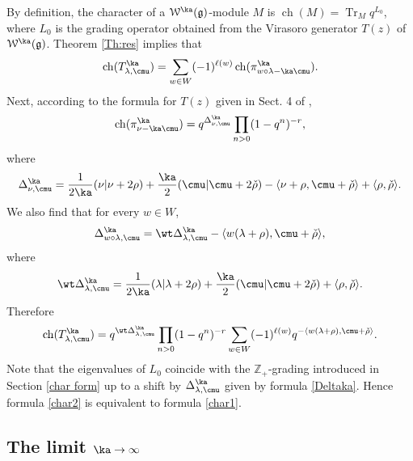 \documentclass{amsart}
\newcommand{\bra}{{\langle}}
\newcommand{\ket}{{\rangle}}
\newcommand{\on}{\operatorname}
\newcommand{\+}{\mathop{\oplus}}
\renewcommand{\*}{{\otimes}}
\newcommand{\mc}{\mathcal}
\newcommand{\mf}{\mathfrak}
\newcommand{\g}{\mf{g}}
\newcommand{\Z}{\mathbb{Z}}
\newcommand{\lam}{\lambda}
\theoremstyle{theorem}
\theoremstyle{remark}
\numberwithin{equation}{section}
\begin{document}
By definition, the character of a ${\mc W}^\ka(\g)$-module $M$ is
$\on{ch}(M) = \on{Tr}_M q^{L_0}$, where $L_0$ is the grading operator
obtained from the Virasoro generator $T(z)$ of ${\mc
  W}^\ka(\g)$. Theorem \ref{Th:res} implies that
$$
\on{ch}(T^\ka_{\lam,\cmu}) = \sum_{w \in W} (-1)^{\ell(w)}
\on{ch}(\pi^\ka_{w \circ \lam - \ka\cmu}).
$$
Next, according to the formula for $T(z)$ given in Sect. 4 of \cite{FF},
$$
\on{ch}(\pi^\ka_{\nu - \ka\cmu}) = q^{\Delta^\ka_{\nu,\cmu}} \prod_{n>0}
(1-q^n)^{-r},
$$
where
\begin{equation}    \label{Deltaka}
\Delta^\ka_{\nu,\cmu} = \frac{1}{2\ka}(\nu|\nu+2\rho) +
\frac{\ka}{2}(\cmu|\cmu+2\check\rho) - \langle
\nu+\rho,\cmu+\check\rho \rangle + \langle \rho,\check\rho \rangle.
\end{equation}
We also find that for every $w \in W$,
$$
\Delta^\ka_{w \circ \lam,\cmu} = \wt\Delta^\ka_{\lam,\cmu} - \bra
w(\lam+\rho),\cmu+\check\rho \ket,
$$
where
$$
\wt\Delta^\ka_{\lam,\cmu} = \frac{1}{2\ka}(\lam|\lam+2\rho) +
\frac{\ka}{2}(\cmu|\cmu+2\check\rho) + \bra \rho,\check\rho \ket.
$$
Therefore
\begin{equation}    \label{char2}
\on{ch}(T^\ka_{\lam,\cmu}) = q^{\wt\Delta^\ka_{\lam,\cmu}} \prod_{n>0}
(1-q^n)^{-r} \sum_{w \in W} (-1)^{\ell(w)} q^{-\bra
w(\lam+\rho),\cmu+\check\rho \ket}.
\end{equation}
Note that the eigenvalues of $L_0$ coincide with the
$\Z_+$-grading introduced in Section \ref{char form} up to a shift by
$\Delta^\ka_{\lam,\cmu}$ given by formula \eqref{Deltaka}. Hence
formula \eqref{char2} is equivalent to formula \eqref{char1}.

\subsection{The limit $\ka \to \infty$}    \label{limit}
\end{document}
